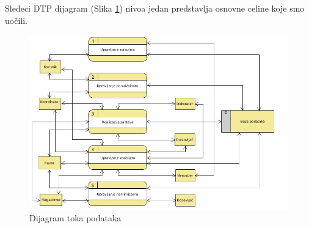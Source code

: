 Sledeci DTP dijagram (Slika \ref{fig:slika2}) nivoa jedan predstavlja osnovne celine koje smo uočili. 
\begin{figure}[ht]
    \leavevmode
    \begin{center}
    \includegraphics[height=0.55\textheight]{slike/DTP.png}
    \end{center}
    \caption{Dijagram toka podataka} %
    \label{fig:slika2}
\end{figure}
